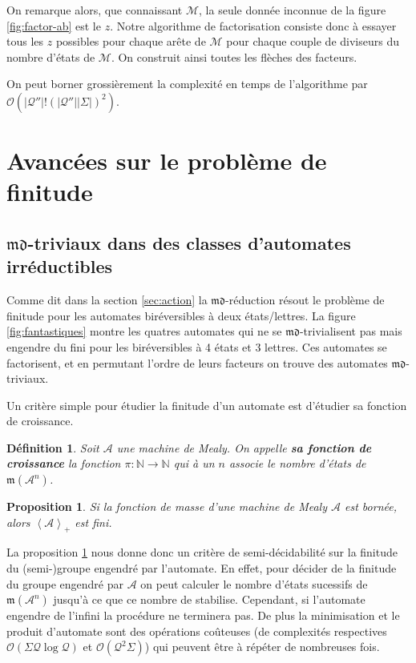 \documentclass[11pt,a4paper]{article}
\newtheorem{prop}{Proposition}
\newtheorem{definition}{Définition}
\begin{document}
On remarque alors, que connaissant $\mathcal{M}$, la seule donnée inconnue de la figure \ref{fig:factor-ab} est le $z$. Notre algorithme de factorisation consiste donc à essayer tous les $z$ possibles pour chaque arête de $\mathcal{M}$ pour chaque couple de diviseurs du nombre d'états de $\mathcal{M}$. On construit ainsi toutes les flèches des facteurs.

On peut borner grossièrement la complexité en temps de l'algorithme par $\mathcal{O}(|\mathcal{Q''}|!\left(|\mathcal{Q''}||\Sigma|\right)^2)$.

\section{Avancées sur le problème de finitude\label{sec:finitude}}

\subsection{$\mathfrak{md}$-triviaux dans des classes d'automates irréductibles}

Comme dit dans la section \ref{sec:action} la $\mathfrak{md}$-réduction résout le problème de finitude pour les automates biréversibles à deux états/lettres. La figure \ref{fig:fantastiques} montre les quatres automates qui ne se $\mathfrak{md}$-trivialisent pas mais engendre du fini pour les biréversibles à 4 états et 3 lettres. Ces automates se factorisent, et en permutant l'ordre de leurs facteurs on trouve des automates $\mathfrak{md}$-triviaux.

Un critère simple pour étudier la finitude d'un automate est d'étudier sa fonction de croissance.

\begin{definition}
  Soit $\mathcal{A}$ une machine de Mealy. On appelle \textbf{\textit{sa fonction de croissance}} la fonction $\pi:\mathbb{N}\rightarrow\mathbb{N}$ qui à un $n$ associe le nombre d'états de $\mathfrak{m}\left(\mathcal{A}^n\right)$.
\end{definition}

\begin{prop}
  \label{prop:mass}
  Si la fonction de masse d'une machine de Mealy $\mathcal{A}$ est bornée, alors $\left<\mathcal{A}\right>_+$ est fini.
\end{prop}

La proposition \ref{prop:mass} nous donne donc un critère de semi-décidabilité sur la finitude du (semi-)groupe engendré par l'automate. En effet, pour décider de la finitude du groupe engendré par $\mathcal{A}$ on peut calculer le nombre d'états sucessifs de $\mathfrak{m}\left(\mathcal{A}^n\right)$ jusqu'à ce que ce nombre de stabilise. Cependant, si l'automate engendre de l'infini la procédure ne terminera pas. De plus la minimisation et le produit d'automate sont des opérations coûteuses (de complexités respectives $\mathcal{O}\left(\Sigma\mathcal{Q}\log\mathcal{Q}\right)$ et $\mathcal{O}\left(\mathcal{Q}^2\Sigma\right)$) qui peuvent être à répéter de nombreuses fois.
\end{document}
